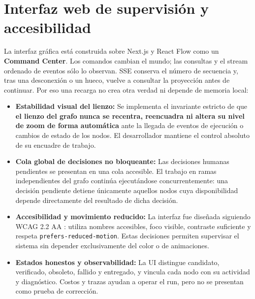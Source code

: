 \section{Interfaz web de supervisión y accesibilidad}

La interfaz gráfica está construida sobre Next.js y React Flow como un
\textbf{Command Center}. Los comandos cambian el mundo; las consultas y el
stream ordenado de eventos sólo lo observan. SSE conserva el número de secuencia
y, tras una desconexión o un hueco, vuelve a consultar la proyección antes de
continuar. Por eso una recarga no crea otra verdad ni depende de memoria local:

\begin{itemize}
  \item \textbf{Estabilidad visual del lienzo:} Se implementa el invariante estricto de que \textbf{el lienzo del grafo nunca se recentra, reencuadra ni altera su nivel de zoom de forma automática} ante la llegada de eventos de ejecución o cambios de estado de los nodos. El desarrollador mantiene el control absoluto de su encuadre de trabajo.
  \item \textbf{Cola global de decisiones no bloqueante:} Las decisiones humanas pendientes se presentan en una cola accesible. El trabajo en ramas independientes del grafo continúa ejecutándose concurrentemente: una decisión pendiente detiene únicamente aquellos nodos cuya disponibilidad depende directamente del resultado de dicha decisión.
  \item \textbf{Accesibilidad y movimiento reducido:} La interfaz fue diseñada siguiendo WCAG 2.2 AA \cite{w3c2023wcag22}: utiliza nombres accesibles, foco visible, contraste suficiente y respeta \texttt{prefers-reduced-motion}. Estas decisiones permiten supervisar el sistema sin depender exclusivamente del color o de animaciones.
  \item \textbf{Estados honestos y observabilidad:} La UI distingue candidato, verificado, obsoleto, fallido y entregado, y vincula cada nodo con su actividad y diagnóstico. Costos y trazas ayudan a operar el run, pero no se presentan como prueba de corrección.
\end{itemize}
